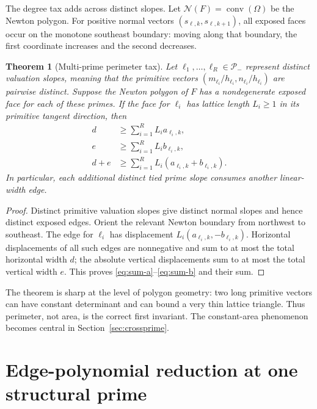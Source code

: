 \documentclass[11pt,oneside]{article}
\newtheorem{theorem}{Theorem}[section]
\theoremstyle{definition}
\theoremstyle{remark}
\newcommand{\conv}{\operatorname{conv}}
\begin{document}
The degree tax adds across distinct slopes.  Let $\mathcal N(F)=\conv(\Omega)$ be the Newton
polygon.  For positive normal vectors $(s_{\ell,k},s_{\ell,k+1})$, all exposed faces occur on
the monotone southeast boundary: moving along that boundary, the first coordinate increases
and the second decreases.

\begin{theorem}[Multi-prime perimeter tax]
\label{thm:perimeter-tax}
Let $\ell_1,\ldots,\ell_R\in\mathcal P_-$ represent distinct valuation slopes, meaning that
the primitive vectors
$(m_{\ell_i}/h_{\ell_i},n_{\ell_i}/h_{\ell_i})$ are pairwise distinct.  Suppose the Newton
polygon of $F$ has a nondegenerate exposed face for each of these primes.  If the face for
$\ell_i$ has lattice length $L_i\ge1$ in its primitive tangent direction, then
\begin{align}
 d&\ge\sum_{i=1}^R L_i a_{\ell_i,k},
 \label{eq:sum-a}\\
 e&\ge\sum_{i=1}^R L_i b_{\ell_i,k},
 \label{eq:sum-b}\\
 d+e&\ge\sum_{i=1}^R L_i(a_{\ell_i,k}+b_{\ell_i,k}).
 \label{eq:sum-perimeter}
\end{align}
In particular, each additional distinct tied prime slope consumes another linear-width edge.
\end{theorem}

\begin{proof}
Distinct primitive valuation slopes give distinct normal slopes and hence distinct exposed
edges.  Orient the relevant Newton boundary from northwest to southeast.  The edge for
$\ell_i$ has displacement
$L_i(a_{\ell_i,k},-b_{\ell_i,k})$.  Horizontal displacements of all such edges are
nonnegative and sum to at most the total horizontal width $d$; the absolute vertical
displacements sum to at most the total vertical width $e$.  This proves
\eqref{eq:sum-a}--\eqref{eq:sum-b} and their sum.
\end{proof}

The theorem is sharp at the level of polygon geometry: two long primitive vectors can have
constant determinant and can bound a very thin lattice triangle.  Thus perimeter, not area,
is the correct first invariant.  The constant-area phenomenon becomes central in
Section~\ref{sec:crossprime}.

\section{Edge-polynomial reduction at one structural prime}
\label{sec:edgepoly}
\end{document}
